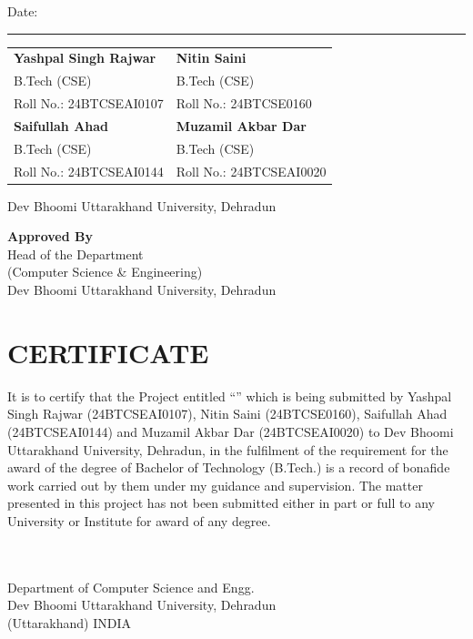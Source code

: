 \vspace{0.8cm}
\noindent Date: \rule{3cm}{0.4pt}

\vspace{0.6cm}
\noindent
\begin{tabularx}{\textwidth}{@{}XX@{}}
\textbf{Yashpal Singh Rajwar} & \textbf{Nitin Saini} \\
B.Tech (CSE) & B.Tech (CSE) \\
Roll No.: 24BTCSEAI0107 & Roll No.: 24BTCSE0160 \\[0.9cm]
\textbf{Saifullah Ahad} & \textbf{Muzamil Akbar Dar} \\
B.Tech (CSE) & B.Tech (CSE) \\
Roll No.: 24BTCSEAI0144 & Roll No.: 24BTCSEAI0020 \\
\end{tabularx}

\vspace{0.4cm}
\noindent Dev Bhoomi Uttarakhand University, Dehradun

\vspace{1.4cm}
\noindent\textbf{Approved By} \hod\\
Head of the Department\\
(Computer Science \& Engineering)\\
Dev Bhoomi Uttarakhand University, Dehradun

\chapter*{CERTIFICATE}
It is to certify that the Project entitled ``\projecttitle'' which is being submitted by Yashpal Singh Rajwar (24BTCSEAI0107), Nitin Saini (24BTCSE0160), Saifullah Ahad (24BTCSEAI0144) and Muzamil Akbar Dar (24BTCSEAI0020) to Dev Bhoomi Uttarakhand University, Dehradun, in the fulfilment of the requirement for the award of the degree of Bachelor of Technology (B.Tech.) is a record of bonafide work carried out by them under my guidance and supervision. The matter presented in this project has not been submitted either in part or full to any University or Institute for award of any degree.

\vspace{2.5cm}
\noindent\textbf{\guide}\\
\guidedesignation\\
Department of Computer Science and Engg.\\
Dev Bhoomi Uttarakhand University, Dehradun\\
(Uttarakhand) INDIA

